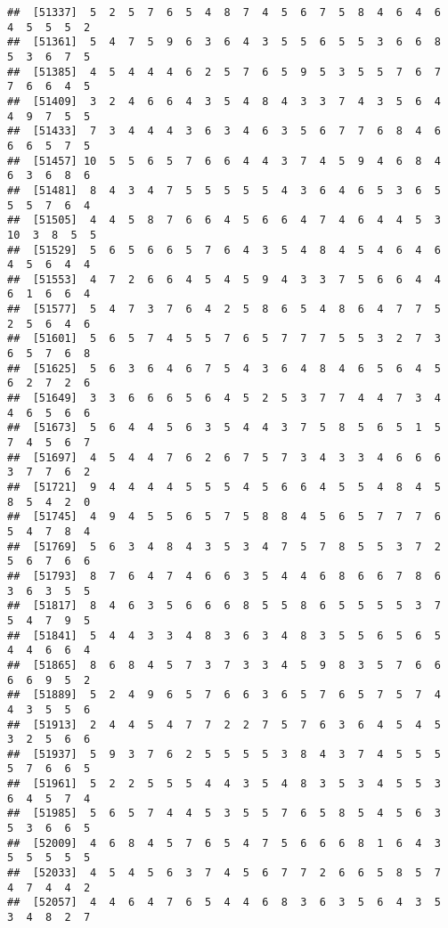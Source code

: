 \documentclass[
]{book}
\begin{document}
\begin{verbatim}
##  [51337]  5  2  5  7  6  5  4  8  7  4  5  6  7  5  8  4  6  4  6  4  5  5  5  2
##  [51361]  5  4  7  5  9  6  3  6  4  3  5  5  6  5  5  3  6  6  8  5  3  6  7  5
##  [51385]  4  5  4  4  4  6  2  5  7  6  5  9  5  3  5  5  7  6  7  7  6  6  4  5
##  [51409]  3  2  4  6  6  4  3  5  4  8  4  3  3  7  4  3  5  6  4  4  9  7  5  5
##  [51433]  7  3  4  4  4  3  6  3  4  6  3  5  6  7  7  6  8  4  6  6  6  5  7  5
##  [51457] 10  5  5  6  5  7  6  6  4  4  3  7  4  5  9  4  6  8  4  6  3  6  8  6
##  [51481]  8  4  3  4  7  5  5  5  5  5  4  3  6  4  6  5  3  6  5  5  5  7  6  4
##  [51505]  4  4  5  8  7  6  6  4  5  6  6  4  7  4  6  4  4  5  3 10  3  8  5  5
##  [51529]  5  6  5  6  6  5  7  6  4  3  5  4  8  4  5  4  6  4  6  4  5  6  4  4
##  [51553]  4  7  2  6  6  4  5  4  5  9  4  3  3  7  5  6  6  4  4  6  1  6  6  4
##  [51577]  5  4  7  3  7  6  4  2  5  8  6  5  4  8  6  4  7  7  5  2  5  6  4  6
##  [51601]  5  6  5  7  4  5  5  7  6  5  7  7  7  5  5  3  2  7  3  6  5  7  6  8
##  [51625]  5  6  3  6  4  6  7  5  4  3  6  4  8  4  6  5  6  4  5  6  2  7  2  6
##  [51649]  3  3  6  6  6  5  6  4  5  2  5  3  7  7  4  4  7  3  4  4  6  5  6  6
##  [51673]  5  6  4  4  5  6  3  5  4  4  3  7  5  8  5  6  5  1  5  7  4  5  6  7
##  [51697]  4  5  4  4  7  6  2  6  7  5  7  3  4  3  3  4  6  6  6  3  7  7  6  2
##  [51721]  9  4  4  4  4  5  5  5  4  5  6  6  4  5  5  4  8  4  5  8  5  4  2  0
##  [51745]  4  9  4  5  5  6  5  7  5  8  8  4  5  6  5  7  7  7  6  5  4  7  8  4
##  [51769]  5  6  3  4  8  4  3  5  3  4  7  5  7  8  5  5  3  7  2  5  6  7  6  6
##  [51793]  8  7  6  4  7  4  6  6  3  5  4  4  6  8  6  6  7  8  6  3  6  3  5  5
##  [51817]  8  4  6  3  5  6  6  6  8  5  5  8  6  5  5  5  5  3  7  5  4  7  9  5
##  [51841]  5  4  4  3  3  4  8  3  6  3  4  8  3  5  5  6  5  6  5  4  4  6  6  4
##  [51865]  8  6  8  4  5  7  3  7  3  3  4  5  9  8  3  5  7  6  6  6  6  9  5  2
##  [51889]  5  2  4  9  6  5  7  6  6  3  6  5  7  6  5  7  5  7  4  4  3  5  5  6
##  [51913]  2  4  4  5  4  7  7  2  2  7  5  7  6  3  6  4  5  4  5  3  2  5  6  6
##  [51937]  5  9  3  7  6  2  5  5  5  5  3  8  4  3  7  4  5  5  5  5  7  6  6  5
##  [51961]  5  2  2  5  5  5  4  4  3  5  4  8  3  5  3  4  5  5  3  6  4  5  7  4
##  [51985]  5  6  5  7  4  4  5  3  5  5  7  6  5  8  5  4  5  6  3  5  3  6  6  5
##  [52009]  4  6  8  4  5  7  6  5  4  7  5  6  6  6  8  1  6  4  3  5  5  5  5  5
##  [52033]  4  5  4  5  6  3  7  4  5  6  7  7  2  6  6  5  8  5  7  4  7  4  4  2
##  [52057]  4  4  6  4  7  6  5  4  4  6  8  3  6  3  5  6  4  3  5  3  4  8  2  7

\end{verbatim}
\end{document}
